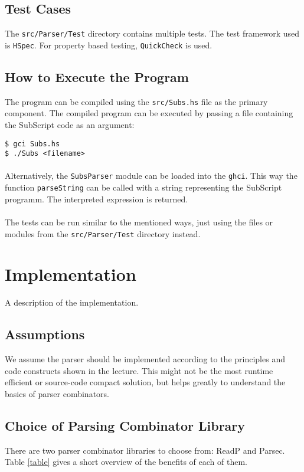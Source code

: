 \documentclass[11pt, a4paper]{article}
\begin{document}
\subsection{Test Cases}
The \texttt{src/Parser/Test} directory contains multiple tests. The test framework used is \texttt{HSpec}. For property based testing, \texttt{QuickCheck} is used.

\subsection{How to Execute the Program}
The program can be compiled using the \texttt{src/Subs.hs} file as the primary component. The compiled program can be executed by passing a file containing the SubScript code as an argument:
\begin{lstlisting}[style=Bash]
$ gci Subs.hs
$ ./Subs <filename>
\end{lstlisting}

\paragraph{}
Alternatively, the \texttt{SubsParser} module can be loaded into the \texttt{ghci}. This way the function \texttt{parseString} can be called with a string representing the SubScript programm. The interpreted expression is returned.

\paragraph{}
The tests can be run similar to the mentioned ways, just using the files or modules from the \texttt{src/Parser/Test} directory instead.

\pagebreak
\section{Implementation}
A description of the implementation.

\subsection{Assumptions}
We assume the parser should be implemented according to the principles and code constructs shown in the lecture. This might not be the most runtime efficient or source-code compact solution, but helps greatly to understand the basics of parser combinators.

\subsection{Choice of Parsing Combinator Library} %
There are two parser combinator libraries to choose from: ReadP and Parsec. Table \ref{table} gives a short overview of the benefits of each of them.
\end{document}
